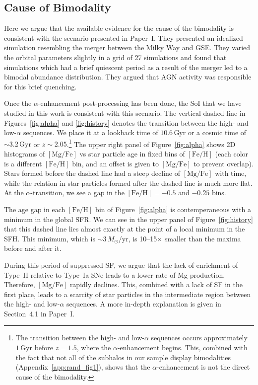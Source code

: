 \documentclass[twocolumn]{aastex631}
\newcommand{\Msun}{\ensuremath{M_{\odot}}}
\newcommand{\Gyr}{\ensuremath{\textrm{Gyr}}}
\newcommand{\FeH}{\ensuremath{[\textrm{Fe}/\textrm{H}]}}
\newcommand{\MgFe}{\ensuremath{[\textrm{Mg}/\textrm{Fe}]}}
\newcommand{\Msunyr}{\ensuremath{\Msun/\textrm{yr}}}
\begin{document}
\subsection{Cause of Bimodality}\label{ssec:bim_cause}
Here we argue that the available evidence for the cause of the bimodality is consistent with the scenario presented in Paper~I. They presented an idealized simulation resembling the merger between the Milky Way and GSE. They varied the orbital parameters slightly in a grid of 27 simulations and found that simulations which had a brief quiescent period as a result of the merger led to a bimodal abundance distribution. They argued that AGN activity was responsible for this brief quenching.

Once the $\alpha$-enhancement post-processing has been done, the SoI that we have studied in this work is consistent with this scenario. The vertical dashed line in Figures~\ref{fig:alpha} and \ref{fig:history} denotes the transition between the high- and low-$\alpha$ sequences. We place it at a lookback time of $10.6\,\Gyr$ or a cosmic time of $\sim3.2\,\Gyr$ or $z\sim2.05$.\footnote{The transition between the high- and low-$\alpha$ sequences occurs approximately $1\,\Gyr$ before $z=1.5$, where the $\alpha$-enhancement begins. This, combined with the fact that not all of the subhalos in our sample display bimodalities (Appendix~\ref{app:rand_fig1}), shows that the $\alpha$-enhancement is not the direct cause of the bimodality.} The upper right panel of Figure~\ref{fig:alpha} shows 2D histograms of \MgFe{} vs star particle age in fixed bins of \FeH{} (each color is a different \FeH{} bin, and an offset is given to \MgFe{} to prevent overlap). Stars formed before the dashed line had a steep decline of \MgFe{} with time, while the relation in star particles formed after the dashed line is much more flat. At the $\alpha$-transition, we see a gap in the $\FeH=-0.5$ and $-0.25$ bins.

The age gap in each \FeH{} bin of Figure~\ref{fig:alpha} is contemperaneous with a minimum in the global SFR. We can see in the upper panel of Figure~\ref{fig:history} that this dashed line lies almost exactly at the point of a local minimum in the SFH. This minimum, which is $\sim3\,\Msunyr$, is 10--15$\times$ smaller than the maxima before and after it.

During this period of suppressed SF, we argue that the lack of enrichment of Type~II relative to Type~Ia SNe leads to a lower rate of Mg production. Therefore, \MgFe{} rapidly declines. This, combined with a lack of SF in the first place, leads to a scarcity of star particles in the intermediate region between the high- and low-$\alpha$ sequences. A more in-depth explanation is given in Section~4.1 in Paper~I.
\end{document}
